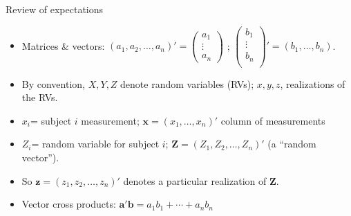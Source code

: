 \documentclass[table, xcolor={dvipsnames}, 9pt]{beamer}
\theoremstyle{newstyle}
\begin{document}
\begin{frame}{Review of expectations}
\begin{itemize}
\item Matrices \& vectors: $(a_{1}, a_{2}, \ldots, a_{n})' = \left(
    \begin{array}{c}
      a_{1} \\ \vdots \\ a_{n}
    \end{array}
\right)$ ;  $\left(
      \begin{array}{c}
        b_{1} \\  \vdots \\ b_{n}\\
      \end{array}
\right)' = (b_{1}, \ldots, b_{n})$.
  \item By convention, $X, Y, Z$ denote random variables (RVs); $x, y, z$, realizations of the RVs.
 \item $x_{i}$= subject $i$ measurement; $\mathbf{x} =(x_{1}, \ldots, x_{n})'$ column of measurements
  \item $Z_i$= random variable for subject $i$; $\mathbf{Z}=(Z_1, Z_2,
    \ldots, Z_n)'$ (a ``random vector'').  
  \item So $\mathbf{z}=(z_1, z_2, \ldots, z_n)'$ denotes a particular
    realization of $\mathbf{Z} $.
  \item Vector cross products: $\mathbf{a}'\mathbf{b}  = a_{1}b_{1} + \cdots + a_{n}b_{n}$
  \end{itemize}
\end{frame}
\end{document}
